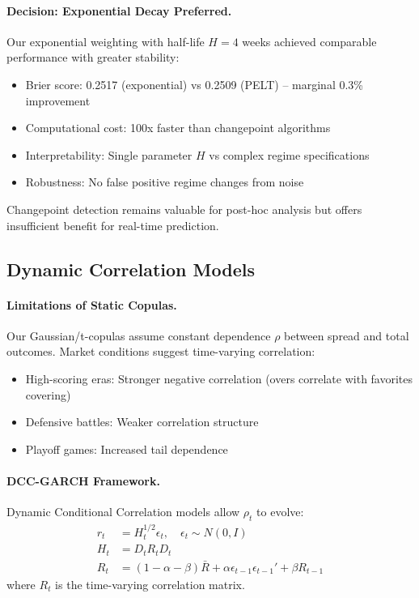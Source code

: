\paragraph{Decision: Exponential Decay Preferred.}
Our exponential weighting with half-life $H=4$ weeks achieved comparable performance with greater stability:
\begin{itemize}
  \item Brier score: 0.2517 (exponential) vs 0.2509 (PELT) -- marginal 0.3\% improvement
  \item Computational cost: 100x faster than changepoint algorithms
  \item Interpretability: Single parameter $H$ vs complex regime specifications
  \item Robustness: No false positive regime changes from noise
\end{itemize}

Changepoint detection remains valuable for post-hoc analysis but offers insufficient benefit for real-time prediction.

\subsection{Dynamic Correlation Models}

\paragraph{Limitations of Static Copulas.}
Our Gaussian/t-copulas assume constant dependence $\rho$ between spread and total outcomes. Market conditions suggest time-varying correlation:
\begin{itemize}
  \item High-scoring eras: Stronger negative correlation (overs correlate with favorites covering)
  \item Defensive battles: Weaker correlation structure
  \item Playoff games: Increased tail dependence
\end{itemize}

\paragraph{DCC-GARCH Framework.}
Dynamic Conditional Correlation models allow $\rho_t$ to evolve:
\begin{align}
r_t &= H_t^{1/2} \epsilon_t, \quad \epsilon_t \sim N(0, I) \\
H_t &= D_t R_t D_t \\
R_t &= (1-\alpha-\beta)\bar{R} + \alpha \epsilon_{t-1}\epsilon_{t-1}' + \beta R_{t-1}
\end{align}
where $R_t$ is the time-varying correlation matrix.

